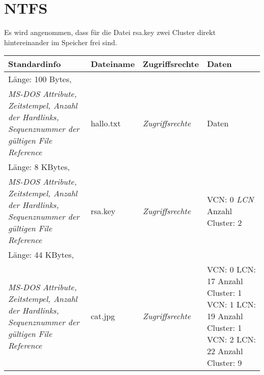 \documentclass[DIN, pagenumber=false, fontsize=11pt, parskip=half]{scrartcl}
\begin{document}
    \section{NTFS}
    Es wird angenommen, dass für die Datei rsa.key zwei Cluster direkt hintereinander im Speicher frei sind.
    \begin{table}[H]
        \centering
        \begin{tabular}{p{}|p{}|p{}|p{}}
            \toprule
            Standardinfo & Dateiname & Zugriffsrechte & Daten \\
            \midrule
            Länge: 100 Bytes,\\ \textit{MS-DOS Attribute, Zeitstempel, Anzahl der Hardlinks, Sequenznummer der gültigen File Reference} & hallo.txt & \textit{Zugriffsrechte} & Daten\\
            \midrule
            Länge: 8 KBytes,\\ \textit{MS-DOS Attribute, Zeitstempel, Anzahl der Hardlinks, Sequenznummer der gültigen File Reference} & rsa.key& \textit{Zugriffsrechte} & VCN: 0 \textit{LCN} Anzahl Cluster: 2\\
            \midrule
            Länge: 44 KBytes,\\ \textit{MS-DOS Attribute, Zeitstempel, Anzahl der Hardlinks, Sequenznummer der gültigen File Reference} & cat.jpg& \textit{Zugriffsrechte} & VCN: 0 LCN: 17 Anzahl Cluster: 1\newline
                VCN: 1 LCN: 19 Anzahl Cluster: 1\newline
                VCN: 2 LCN: 22 Anzahl Cluster: 9\\
            \bottomrule
        \end{tabular}
    \end{table}
\end{document}
